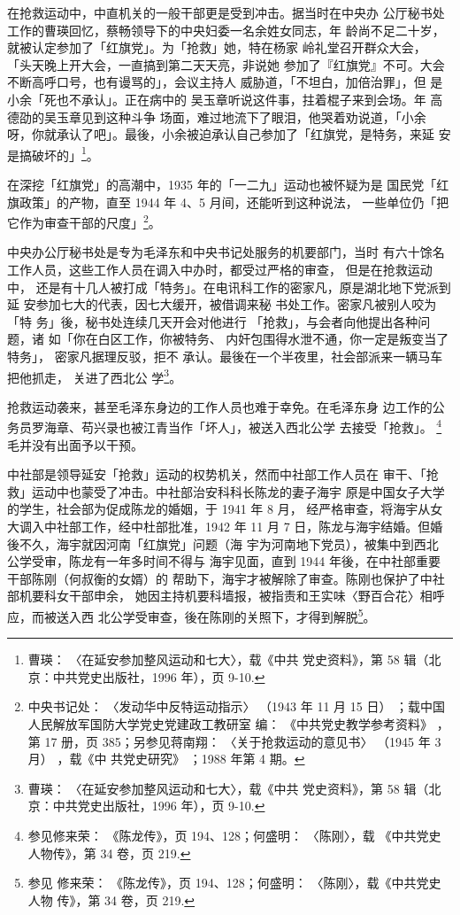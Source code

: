 在抢救运动中，中直机关的一般干部更是受到冲击。据当时在中央办 公厅秘书处
工作的曹瑛回忆，蔡畅领导下的中央妇委一名余姓女同志，年 龄尚不足二十岁，
就被认定参加了「红旗党」。为「抢救」她，特在杨家 岭礼堂召开群众大会，
「头天晚上开大会，一直搞到第二天天亮，非说她 参加了『红旗党』不可。大会
不断高呼口号，也有谩骂的」，会议主持人 威胁道，「不坦白，加倍治罪」，但
是小余「死也不承认」。正在病中的 吴玉章听说这件事，拄着棍子来到会场。年
高德劭的吴玉章见到这种斗争 场面，难过地流下了眼泪，他哭着劝说道，「小余
呀，你就承认了吧」。最後，小余被迫承认自己参加了「红旗党，是特务，来延
安是搞破坏的」\footnote{曹瑛： 〈在延安参加整风运动和七大〉，载《中共
党史资料》，第 58 辑（北京：中共党史出版社，1996 年），页 9-10.}。

在深挖「红旗党」的高潮中，1935 年的「一二九」运动也被怀疑为是
国民党「红旗政策」的产物，直至 1944 年 4、5 月间，还能听到这种说法，
一些单位仍「把它作为审查干部的尺度」\footnote{中央书记处：
〈发动华中反特运动指示〉
（1943 年 11 月 15 日）
；载中国人民解放军国防大学党史党建政工教研室
编：
《中共党史教学参考资料》
，第 17 册，页 385；另参见蒋南翔：
〈关于抢救运动的意见书〉
（1945 年 3 月）
，载《中
共党史研究》
；1988 年第 4 期。}。
 
中央办公厅秘书处是专为毛泽东和中央书记处服务的机要部门，当时 有六十馀名
工作人员，这些工作人员在调入中办时，都受过严格的审查， 但是在抢救运动中，
还是有十几人被打成「特务」。在电讯科工作的密家凡，原是湖北地下党派到延
安参加七大的代表，因七大缓开，被借调来秘 书处工作。密家凡被别人咬为「特
务」後，秘书处连续几天开会对他进行 「抢救」，与会者向他提出各种问题，诸
如「你在白区工作，你被特务、 内奸包围得水泄不通，你一定是叛变当了特务」，
密家凡据理反驳，拒不 承认。最後在一个半夜里，社会部派来一辆马车把他抓走，
关进了西北公 学\footnote{曹瑛： 〈在延安参加整风运动和七大〉，载《中共
党史资料》，第 58 辑（北京：中共党史出版社，1996 年），页 9-10.}。

抢救运动袭来，甚至毛泽东身边的工作人员也难于幸免。在毛泽东身 边工作的公
务员罗海章、苟兴录也被江青当作「坏人」，被送入西北公学 去接受「抢救」。
\footnote{参见修来荣： 《陈龙传》，页 194、128；何盛明： 〈陈刚〉，载
《中共党史人物传》，第 34 卷，页 219.}毛并没有出面予以干预。

中社部是领导延安「抢救」运动的权势机关，然而中社部工作人员在 审干、「抢
救」运动中也蒙受了冲击。中社部治安科科长陈龙的妻子海宇 原是中国女子大学
的学生，社会部为促成陈龙的婚姻，于 1941 年 8 月， 经严格审查，将海宇从女
大调入中社部工作，经中杜部批准，1942 年 11 月 7 日，陈龙与海宇结婚。但婚
後不久，海宇就因河南「红旗党」问题（海 宇为河南地下党员），被集中到西北
公学受审，陈龙有一年多时间不得与 海宇见面，直到 1944 年後，在中社部重要
干部陈刚（何叔衡的女婿）的 帮助下，海宇才被解除了审查。陈刚也保护了中社
部机要科女干部申余， 她因主持机要科墙报，被指责和王实味〈野百合花〉相呼
应，而被送入西 北公学受审查，後在陈刚的关照下，才得到解脱\footnote{参见
修来荣： 《陈龙传》，页 194、128；何盛明： 〈陈刚〉，载《中共党史人物
传》，第 34 卷，页 219.}。

